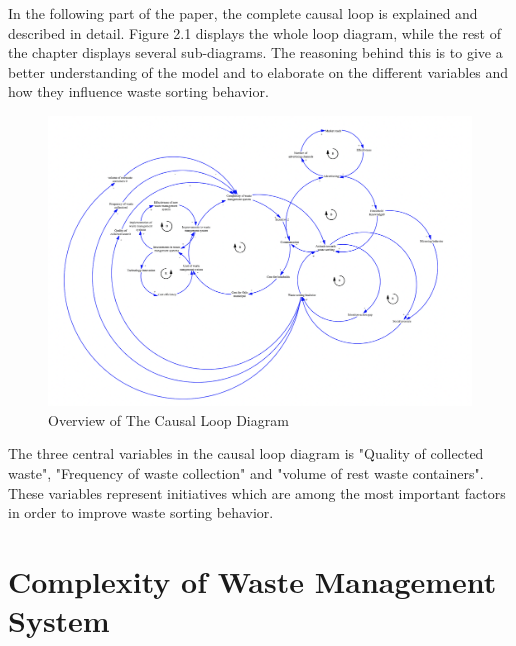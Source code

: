 In the following part of the paper, the complete causal loop is explained and described in detail. Figure 2.1 displays the whole loop diagram, while the rest of the chapter displays several sub-diagrams. The reasoning behind this is to give a better understanding of the model and to elaborate on the different variables and how they influence waste sorting behavior. 


\begin{figure}[H]
\centering
\includegraphics [scale=0.25,angle=90]{figures/fullcld.png}
\caption{Overview of The Causal Loop Diagram}
\label{fig:fullcld}
\end{figure}

\indent \newline
The three central variables in the causal loop diagram is "Quality of collected waste", "Frequency of waste collection" and "volume of rest waste containers". These variables represent initiatives which are among the most important factors in order to improve waste sorting behavior.  

\section{Complexity of Waste Management System}

